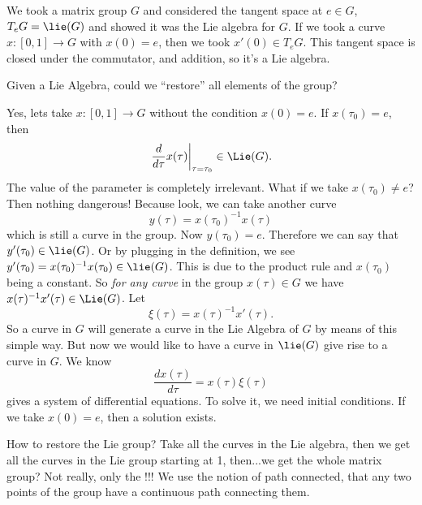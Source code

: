 We took a matrix group $G$ and considered the tangent space at
$e\in G$, $T_{e}G=\lie(G)$ and showed it was the Lie algebra for
$G$. If we took a curve $x\colon[0,1]\to G$ with $x(0)=e$, then
we took $x'(0)\in T_{e}G$. This tangent space is closed under the
commutator, and addition, so it's a Lie algebra.
\medbreak
\begin{quest}
Given a Lie Algebra, could we ``restore'' all elements of the group?
\end{quest}
\medbreak
Yes, lets take $x\colon[0,1]\to G$ without the condition
$x(0)=e$. If $x(\tau_{0})=e$, then 
\begin{equation}
\left.\frac{d}{d\tau}x(\tau)\right|_{\tau=\tau_{0}}\in\Lie(G).
\end{equation}
The value of the parameter is completely irrelevant. What if we
take $x(\tau_0)\not=e$? Then nothing dangerous! Because look, we
can take another curve
\begin{equation}
y(\tau)=x(\tau_{0})^{-1}x(\tau)
\end{equation}
which is still a curve in the group. Now
$y(\tau_{0})=e$. Therefore we can say that
$y'(\tau_{0})\in\lie(G)$. Or by plugging in the definition, we
see $y'(\tau_{0})=x(\tau_{0})^{-1}x(\tau_{0})\in\lie(G)$. This is
due to the product rule and $x(\tau_{0})$ being a constant. So
\emph{for any curve} in the group $x(\tau)\in G$ we have
$x(\tau)^{-1}x'(\tau)\in\Lie(G)$. Let
\begin{equation}
\xi(\tau)=x(\tau)^{-1}x'(\tau).
\end{equation}
So a curve in $G$ will generate a curve in the Lie Algebra of $G$
by means of this simple way. But now we would like to have a
curve in $\lie(G)$ give rise to a curve in $G$. We know
\begin{equation}
\frac{dx(\tau)}{d\tau}=x(\tau)\xi(\tau)
\end{equation}
gives a system of differential equations. To solve it, we need
initial conditions. If we take $x(0)=e$, then a solution exists.

How to restore the Lie group? Take all the curves in the Lie
algebra, then we get all the curves in the Lie group starting at
1, then...we get the whole matrix group? Not really, only the
!!! We use the notion of path connected,
that any two points of the group have a continuous path
connecting them. 

